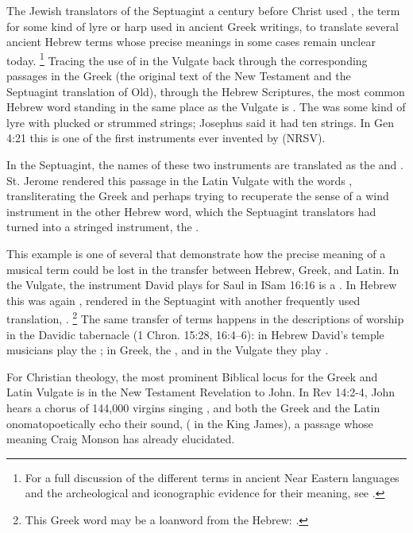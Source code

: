 The Jewish translators of the Septuagint a century before Christ used
, the term for some kind of lyre or harp used in ancient Greek writings, to translate several ancient Hebrew terms whose precise meanings in some cases remain unclear today.%
	\footnote{%
	For a full discussion of the different terms in ancient Near Eastern languages and the archeological and iconographic evidence for their meaning, see \autocite{Lawergren:Lyres}.
	}
Tracing the use of  in the Vulgate back through the corresponding passages in the Greek (the original text of the New Testament and the Septuagint translation of Old), through the Hebrew Scriptures, the most common Hebrew word standing in the same place as the Vulgate  is .
The  was some kind of lyre with plucked or strummed strings; Josephus said it had ten strings.%
	\autocites[]{Bromily:BibleEncyclopedia}
In Gen 4:21 this is one of the first instruments ever invented by  (NRSV).

In the Septuagint, the names of these two instruments are translated as the
 and .
St. Jerome rendered this passage in the Latin Vulgate with the words
, transliterating the Greek  and perhaps trying to recuperate the sense of a wind instrument in the other Hebrew word, which the Septuagint translators had turned into a stringed instrument, the .

This example is one of several that demonstrate how the precise meaning of a musical term could be lost in the transfer between Hebrew, Greek, and Latin.
In the Vulgate, the instrument David plays for Saul in ISam 16:16 is a .
In Hebrew this was again , rendered in the Septuagint with another
frequently used translation, .%
	\footnote{%
	This Greek word may be a loanword from the Hebrew: \autocite{Brown:HebrewOTLexicon}{}.
	}
The same transfer of terms happens in the descriptions of worship in the Davidic
tabernacle (1 Chron. 15:28, 16:4--6): in Hebrew David's temple musicians play
the ; in Greek, the , and in the Vulgate they
play .%

For Christian theology, the most prominent Biblical locus for the Greek
 and Latin Vulgate  is in the New Testament Revelation to John.
In Rev 14:2-4, John hears a chorus of 144,000 virgins singing , and both the Greek and the Latin onomatopoetically echo
their sound,  ( in the King James), a passage whose meaning Craig Monson has already elucidated.%
	\autocite[88--95]{Monson:DivasConvent}

